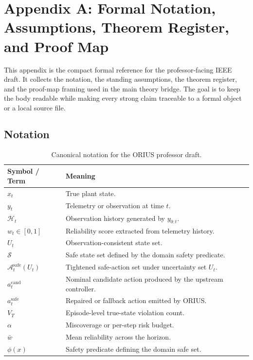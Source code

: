 \section{Appendix A: Formal Notation, Assumptions, Theorem Register, and Proof Map}
\label{sec:prof-app-a}

This appendix is the compact formal reference for the professor-facing IEEE draft.  It
collects the notation, the standing assumptions, the theorem register, and the proof-map
framing used in the main theory bridge.  The goal is to keep the body readable while
making every strong claim traceable to a formal object or a local source file.

\subsection{Notation}
\begin{table}[t]
\centering
\caption{Canonical notation for the ORIUS professor draft.}
\label{tab:prof-notation}
\begin{tabular}{p{}p{}}
\toprule
\textbf{Symbol / Term} & \textbf{Meaning} \\
\midrule
\(x_t\) & True plant state. \\
\(y_t\) & Telemetry or observation at time \(t\). \\
\(\mathcal{H}_t\) & Observation history generated by \(y_{0:t}\). \\
\(w_t\in[0,1]\) & Reliability score extracted from telemetry history. \\
\(U_t\) & Observation-consistent state set. \\
\(\mathcal{S}\) & Safe state set defined by the domain safety predicate. \\
\(\mathcal{A}_t^{\mathrm{safe}}(U_t)\) & Tightened safe-action set under uncertainty set \(U_t\). \\
\(a_t^{\mathrm{cand}}\) & Nominal candidate action produced by the upstream controller. \\
\(a_t^{\mathrm{safe}}\) & Repaired or fallback action emitted by ORIUS. \\
\(V_T\) & Episode-level true-state violation count. \\
\(\alpha\) & Miscoverage or per-step risk budget. \\
\(\bar{w}\) & Mean reliability across the horizon. \\
\(\phi(x)\) & Safety predicate defining the domain safe set. \\
\bottomrule
\end{tabular}
\end{table}

